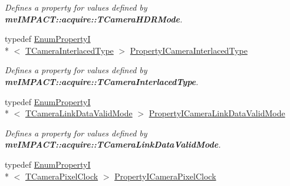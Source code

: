 \begin{DoxyCompactItemize}
\begin{DoxyCompactList}\small\item\em Defines a property for values defined by {\bfseries mv\+I\+M\+P\+A\+C\+T\+::acquire\+::\+T\+Camera\+H\+D\+R\+Mode}. \end{DoxyCompactList}\item 
\hypertarget{group___device_specific_interface_gad01921546e8dc7787753af3e80401ab4}{typedef \hyperlink{classmv_i_m_p_a_c_t_1_1acquire_1_1_enum_property_i}{Enum\+Property\+I}\\*
$<$ \hyperlink{group___device_specific_interface_ga88ebb3c75921a96f51a3ea81ba253466}{T\+Camera\+Interlaced\+Type} $>$ \hyperlink{group___device_specific_interface_gad01921546e8dc7787753af3e80401ab4}{Property\+I\+Camera\+Interlaced\+Type}}\label{group___device_specific_interface_gad01921546e8dc7787753af3e80401ab4}

\begin{DoxyCompactList}\small\item\em Defines a property for values defined by {\bfseries mv\+I\+M\+P\+A\+C\+T\+::acquire\+::\+T\+Camera\+Interlaced\+Type}. \end{DoxyCompactList}\item 
\hypertarget{group___device_specific_interface_gaf6940dc7fdb7d3db42b5cace6bca208b}{typedef \hyperlink{classmv_i_m_p_a_c_t_1_1acquire_1_1_enum_property_i}{Enum\+Property\+I}\\*
$<$ \hyperlink{group___device_specific_interface_gab4d89af185da36c227fc9dc396e97e9f}{T\+Camera\+Link\+Data\+Valid\+Mode} $>$ \hyperlink{group___device_specific_interface_gaf6940dc7fdb7d3db42b5cace6bca208b}{Property\+I\+Camera\+Link\+Data\+Valid\+Mode}}\label{group___device_specific_interface_gaf6940dc7fdb7d3db42b5cace6bca208b}

\begin{DoxyCompactList}\small\item\em Defines a property for values defined by {\bfseries mv\+I\+M\+P\+A\+C\+T\+::acquire\+::\+T\+Camera\+Link\+Data\+Valid\+Mode}. \end{DoxyCompactList}\item 
\hypertarget{group___device_specific_interface_ga346a75ab93c8255ce16833b47718680d}{typedef \hyperlink{classmv_i_m_p_a_c_t_1_1acquire_1_1_enum_property_i}{Enum\+Property\+I}\\*
$<$ \hyperlink{group___device_specific_interface_ga1f8b8cce27b21801b19c30f2aafae508}{T\+Camera\+Pixel\+Clock} $>$ \hyperlink{group___device_specific_interface_ga346a75ab93c8255ce16833b47718680d}{Property\+I\+Camera\+Pixel\+Clock}}\label{group___device_specific_interface_ga346a75ab93c8255ce16833b47718680d}


\end{DoxyCompactItemize}
